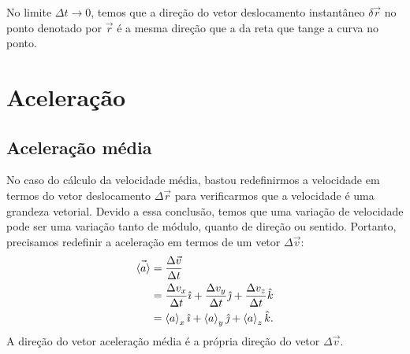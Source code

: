 \begin{marginfigure}
\caption{No limite $\Delta t \to 0$, temos que a direção do vetor deslocamento instantâneo $\delta\vec{r}$ no ponto denotado por $\vec{r}$ é a mesma direção que a da reta que tange a curva no ponto.\label{Fig:Dir_vel}}
\end{marginfigure}

\section{Aceleração}

\subsection{Aceleração média}

No caso do cálculo da velocidade média, bastou redefinirmos a velocidade em termos do vetor deslocamento $\Delta\vec{r}$ para verificarmos que a velocidade é uma grandeza vetorial. Devido a essa conclusão, temos que uma variação de velocidade pode ser uma variação tanto de módulo, quanto de direção ou sentido. Portanto, precisamos redefinir a aceleração em termos de um vetor $\Delta\vec{v}$:
\begin{align}
  \vec{\left\langle{a}\right\rangle} &= \frac{\Delta\vec{v}}{\Delta t} \\
  &= \frac{\Delta v_x}{\Delta t}\hat{\imath} + \frac{\Delta v_y}{\Delta t}\hat{\jmath} + \frac{\Delta v_z}{\Delta t}\hat{k} \\
  &= \left\langle{a}\right\rangle_x\hat{\imath} + \left\langle{a}\right\rangle_y\hat{\jmath} + \left\langle{a}\right\rangle_z\hat{k}.
\end{align} 
%
A direção do vetor aceleração média é a própria direção do vetor $\Delta{\vec{v}}$. 

